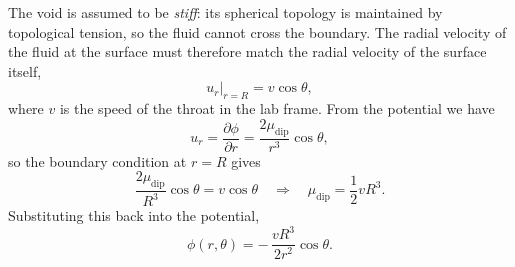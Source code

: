 \documentclass[11pt]{article}
\begin{document}
The void is assumed to be \emph{stiff}: its spherical topology is maintained
by topological tension, so the fluid cannot cross the boundary.
The radial velocity of the fluid at the surface must therefore match the
radial velocity of the surface itself,
\begin{equation}
  u_r\big|_{r=R} = v\cos\theta,
\end{equation}
where $v$ is the speed of the throat in the lab frame.
From the potential we have
\begin{equation}
  u_r = \frac{\partial\phi}{\partial r}
      = \frac{2\mu_{\mathrm{dip}}}{r^3}\cos\theta,
\end{equation}
so the boundary condition at $r=R$ gives
\begin{equation}
  \frac{2\mu_{\mathrm{dip}}}{R^3}\cos\theta = v\cos\theta
  \quad\Rightarrow\quad
  \mu_{\mathrm{dip}} = \frac{1}{2} v R^3.
\end{equation}
Substituting this back into the potential,
\begin{equation}
  \phi(r,\theta) = -\,\frac{v R^3}{2 r^2}\cos\theta.
\end{equation}
\end{document}
